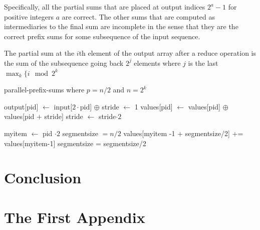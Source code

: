 \documentclass[12pt,twoside]{reedthesis}
\begin{document}
Specifically, all the partial sums that are placed at output indices $2^a-1$ for positive integers $a$ are correct. The other sums that are computed as intermediaries to the final sum are incomplete in the sense that they are the correct prefix sums for some subsequence of the input sequence.

The partial sum at the $i$th element of the output array  after a reduce operation is the sum of the subsequence going back $2^j$ elements where $j$ is the last   $\max_k \{ i \mod 2^k $

\begin{algorithm}[h!]
\caption{parallel-prefix-sums where $p = n/2$ and $n=2^k$}
\begin{algorithmic}
\STATE output[pid] $\leftarrow$ input[$2\cdot \mbox{pid}$] $\oplus$
\STATE stride $\leftarrow$ 1
\STATE values[pid] $\leftarrow$ values[pid] $\oplus$ values[pid $+$ stride] 
\STATE stride $\leftarrow$ stride$\cdot 2$
\ENDWHILE
\RETURN

\STATE myitem $\leftarrow$ pid $\cdot 2$ 
\STATE segmentsize $= n/2$
\STATE values[myitem -1 + segmentsize/2] += values[myitem-1]
\ENDIF
\STATE segmentsize = segmentsize/2

\ENDWHILE
\end{algorithmic}
\end{algorithm}
	
\chapter*{Conclusion}
	\setcounter{chapter}{4}
	\setcounter{section}{0}
	

    \appendix
      \chapter{The First Appendix}



  \backmatter 

    \nocite{*}
    
\end{document}
